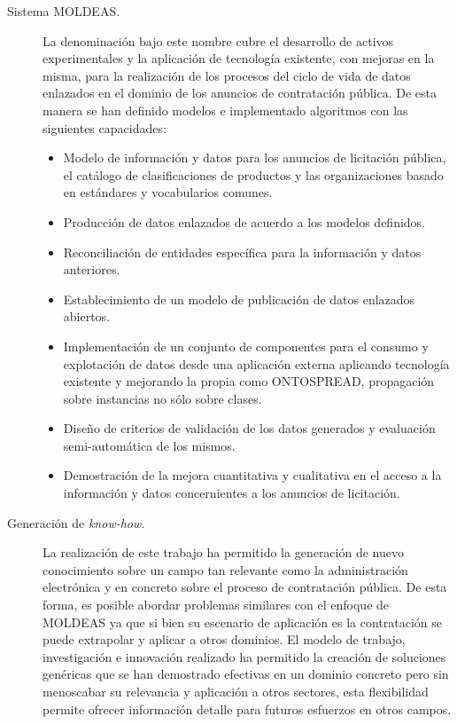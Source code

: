 \begin{description}
\item [Sistema MOLDEAS.] La denominación bajo este nombre cubre el desarrollo de activos experimentales y la aplicación de tecnología 
existente, con mejoras en la misma, para la realización de los procesos del ciclo de vida de datos enlazados en el dominio de los 
anuncios de contratación pública. De esta manera se han definido modelos e implementado algoritmos con las siguientes capacidades:
\begin{itemize}
 \item Modelo de información y datos para los anuncios de licitación pública, el catálogo de clasificaciones de productos y las organizaciones basado 
en estándares y vocabularios comunes.
 \item Producción de datos enlazados de acuerdo a los modelos definidos.
 \item Reconciliación de entidades específica para la información y datos anteriores.
 \item Establecimiento de un modelo de publicación de datos enlazados abiertos.
 \item Implementación de un conjunto de componentes para el consumo y explotación de datos 
desde una aplicación externa aplicando tecnología existente y mejorando la propia como ONTOSPREAD, propagación sobre instancias no 
sólo sobre clases.
 \item Diseño de criterios de validación de los datos generados y evaluación semi-automática de los mismos.
 \item Demostración de la mejora cuantitativa y cualitativa en el acceso a la información y datos concernientes 
a los anuncios de licitación.
\end{itemize}
\item [Generación de \textit{know-how}.] La realización de este trabajo ha permitido la generación de nuevo conocimiento sobre 
un campo tan relevante como la administración electrónica y en concreto sobre el proceso de contratación pública. De esta forma, 
es posible abordar problemas similares con el enfoque de \gls{MOLDEAS} ya que si bien su escenario de aplicación es la contratación 
se puede extrapolar y aplicar a otros dominios. El modelo de trabajo, investigación e innovación realizado ha permitido 
la creación de soluciones genéricas que se han demostrado efectivas en un dominio concreto pero sin menoscabar su relevancia 
y aplicación a otros sectores, esta flexibilidad permite ofrecer información detalle para futuros esfuerzos en otros campos.
\end{description}
